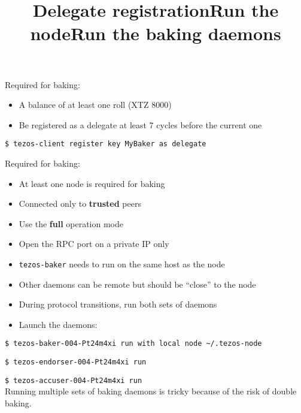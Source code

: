 \documentclass{slides}
\begin{document}
\begin{slide}
  \title{Delegate registration}
  Required for baking:\\
  \begin{itemize}
    \item A balance of at least one roll (XTZ 8000)
    \item Be registered as a delegate at least 7 cycles before the
      current one
  \end{itemize}
  \lstinline[style=BashInputStyle]'$ tezos-client register key MyBaker as delegate'
\end{slide}

\begin{slide}
  \title{Run the node}
  Required for baking:\\
  \begin{itemize}
    \item At least one node is required for baking
    \item Connected only to \textbf{trusted} peers
    \item Use the \textbf{full} operation mode
    \item Open the RPC port on a private IP only
  \end{itemize}
\end{slide}

\begin{slide}
  \title{Run the baking daemons}
  \begin{itemize}
    \item \texttt{tezos-baker} needs to run on the same host as the
      node
    \item Other daemons can be remote but should be “close” to the node
    \item During protocol transitions, run both sets of daemons
    \item Launch the daemons:\\
  \end{itemize}

  \lstinline[style=BashInputStyle]'$ tezos-baker-004-Pt24m4xi run with local node ~/.tezos-node'

\lstinline[style=BashInputStyle]'$ tezos-endorser-004-Pt24m4xi run'

\lstinline[style=BashInputStyle]'$ tezos-accuser-004-Pt24m4xi run'\\

Running multiple sets of baking daemons is tricky because of the risk
of double baking.

\end{slide}
\end{document}
